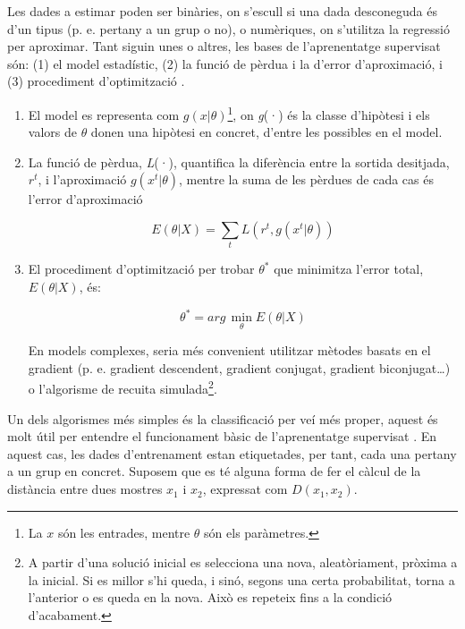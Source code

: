 \documentclass[12pt,a4paper,final,twoside]{report}
\begin{document}
Les dades a estimar poden ser binàries, on s'escull si una dada desconeguda és d'un tipus (p. e. pertany a un grup o no), o numèriques, on s'utilitza la regressió per aproximar. Tant siguin unes o altres, les bases de l'aprenentatge supervisat són: (1) el model estadístic, (2) la funció de pèrdua i la d'error d'aproximació, i (3) procediment d'optimització \cite{Alpaydin2004}.

\begin{enumerate}

\item El model es representa com $g(x|\theta)$\footnote{La $x$ són les entrades, mentre $\theta$ són els paràmetres.}, on \textit{g}(·) és la classe d'hipòtesi i els valors de $\theta$ donen una hipòtesi en concret, d'entre les possibles en el model.

\item La funció de pèrdua, \textit{L}(·), quantifica la diferència entre la sortida desitjada, $r^t$, i l'aproximació $g(x^t|\theta)$, mentre la suma de les pèrdues de cada cas és l'error d'aproximació 

\begin{equation} \label{eq:er-aprox}
E(\theta|X)=\sum_{t} L(r^t,g(x^t|\theta))
\end{equation}

\item El procediment d'optimització per trobar $\theta^*$ que minimitza l'error total, $E(\theta|X)$, és:

\begin{equation} \label{eq:theta-opt}
\theta^*=arg\,\operatorname*{min}_\theta E(\theta|X)
\end{equation}

En models complexes, seria més convenient utilitzar mètodes basats en el gradient (p. e. gradient descendent, gradient conjugat, gradient biconjugat\dots) o l'algorisme de recuita simulada\footnote{A partir d'una solució inicial es selecciona una nova, aleatòriament, pròxima a la inicial. Si es millor s'hi queda, i sinó, segons una certa probabilitat, torna a l'anterior o es queda en la nova. Això es repeteix fins a la condició d'acabament\cite{Torrent-Fontbona2013}.}.

\end{enumerate}

Un dels algorismes més simples és la classificació per veí més proper, aquest és molt útil per entendre el funcionament bàsic de l'aprenentatge supervisat \cite{Learned-Miller2014}. En aquest cas, les dades d'entrenament estan etiquetades, per tant, cada una pertany a un grup en concret. Suposem que es té alguna forma de fer el càlcul de la distància entre dues mostres $x_{1}$ i $x_{2}$, expressat com $D(x_{1}, x_{2})$.
\end{document}
